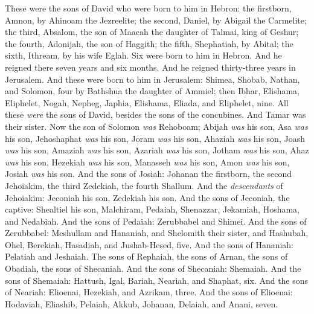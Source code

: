 \begin{biblechapter} %
 These were the sons of David who were born to him in Hebron: the firstborn, Amnon, by Ahinoam the Jezreelite; the second, Daniel, by Abigail the Carmelite;
\verse the third, Absalom, the son of Maacah the daughter of Talmai, king of Geshur; the fourth, Adonijah, the son of Haggith;
\verse the fifth, Shephatiah, by Abital; the sixth, Ithream, by his wife Eglah.
\verse Six were born to him in Hebron. And he reigned there seven years and six months. And he reigned thirty-three years in Jerusalem.
\verse And these were born to him in Jerusalem: Shimea, Shobab, Nathan, and Solomon, four by Bathshua the daughter of Ammiel;
\verse then Ibhar, Elishama, Eliphelet,
\verse Nogah, Nepheg, Japhia,
\verse Elishama, Eliada, and Eliphelet, nine.
\verse All these \textit{were} the sons of David, besides the sons of the concubines. And Tamar was their sister.
\verse Now the son of Solomon \textit{was} Rehoboam; Abijah \textit{was} his son, Asa \textit{was} his son, Jehoshaphat \textit{was} his son,
\verse Joram \textit{was} his son, Ahaziah \textit{was} his son, Joash \textit{was} his son,
\verse Amaziah \textit{was} his son, Azariah \textit{was} his son, Jotham \textit{was} his son,
\verse Ahaz \textit{was} his son, Hezekiah \textit{was} his son, Manasseh \textit{was} his son,
\verse Amon \textit{was} his son, Josiah \textit{was} his son.
\verse And the sons of Josiah: Johanan the firstborn, the second Jehoiakim, the third Zedekiah, the fourth Shallum.
\verse And the \textit{descendants} of Jehoiakim: Jeconiah his son, Zedekiah his son.
\verse And the sons of Jeconiah, the captive: Shealtiel his son,
\verse Malchiram, Pedaiah, Shenazzar, Jekamiah, Hoshama, and Nedabiah.
\verse And the sons of Pedaiah: Zerubbabel and Shimei. And the sons of Zerubbabel: Meshullam and Hananiah, and Shelomith their sister,
\verse and Hashubah, Ohel, Berekiah, Hasadiah, and Jushab-Hesed, five.
\verse And the sons of Hananiah: Pelatiah and Jeshaiah. The sons of Rephaiah, the sons of Arnan, the sons of Obadiah, the sons of Shecaniah.
\verse And the sons of Shecaniah: Shemaiah. And the sons of Shemaiah: Hattush, Igal, Bariah, Neariah, and Shaphat, six.
\verse And the sons of Neariah: Elioenai, Hezekiah, and Azrikam, three.
\verse And the sons of Elioenai: Hodaviah, Eliashib, Pelaiah, Akkub, Johanan, Delaiah, and Anani, seven.
\end{biblechapter}

